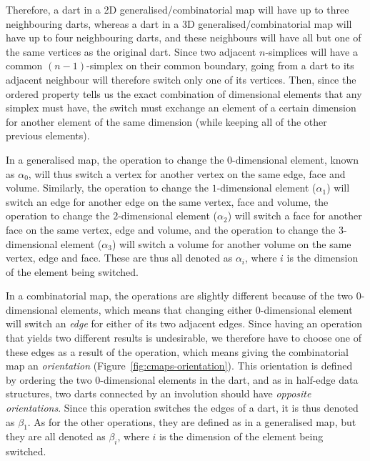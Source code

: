 Therefore, a dart in a 2D generalised/combinatorial map will have up to three neighbouring darts, whereas a dart in a 3D generalised/combinatorial map will have up to four neighbouring darts, and these neighbours will have all but one of the same vertices as the original dart.
Since two adjacent \(n\)-simplices will have a common \((n-1)\)-simplex on their common boundary, going from a dart to its adjacent neighbour will therefore switch only one of its vertices.
Then, since the ordered property tells us the exact combination of dimensional elements that any simplex must have, the switch must exchange an element of a certain dimension for another element of the same dimension (while keeping all of the other previous elements).

In a generalised map, the operation to change the \(0\)-dimensional element, known as \(\alpha_0\), will thus switch a vertex for another vertex on the same edge, face and volume.
Similarly, the operation to change the \(1\)-dimensional element (\(\alpha_1\)) will switch an edge for another edge on the same vertex, face and volume, the operation to change the \(2\)-dimensional element (\(\alpha_2\)) will switch a face for another face on the same vertex, edge and volume, and the operation to change the \(3\)-dimensional element (\(\alpha_3\)) will switch a volume for another volume on the same vertex, edge and face.
These are thus all denoted as \(\alpha_i\)\marginnote{\(\alpha\)}\index{\(\alpha\)}, where \(i\) is the dimension of the element being switched.

In a combinatorial map, the operations are slightly different because of the two \(0\)-dimensional elements, which means that changing either \(0\)-dimensional element will switch an \emph{edge} for either of its two adjacent edges.
Since having an operation that yields two different results is undesirable, we therefore have to choose one of these edges as a result of the operation, which means giving the combinatorial map an \emph{orientation} (Figure~\ref{fig:cmaps-orientation}).
This orientation is defined by ordering the two \(0\)-dimensional elements in the dart, and as in half-edge data structures, two darts connected by an involution should have \emph{opposite orientations}.
Since this operation switches the edges of a dart, it is thus denoted as \(\beta_1\).
As for the other operations, they are defined as in a generalised map, but they are all denoted as \(\beta_i\)\marginnote{\(\beta\)}\index{\(\beta\)}, where \(i\) is the dimension of the element being switched.

